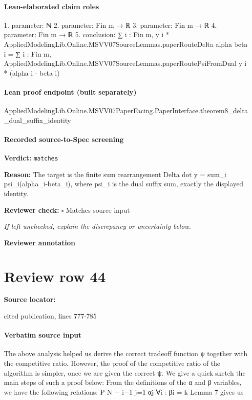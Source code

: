 \documentclass[10pt]{article}
\newcommand{\reviewerbox}{%
  \par\noindent\fbox{\parbox{0.96\linewidth}{\rule{0pt}{0.38in}}}\par
}
\newcommand{\reviewmatch}[1]{%
  \par\noindent\textbf{Reviewer check:} $\square$\; #1\par
  \noindent\emph{If left unchecked, explain the discrepancy or uncertainty below.}\par
}
\begin{document}
\paragraph{Lean-elaborated claim roles}\begin{ReviewVerbatim}
1. parameter: ℕ
2. parameter: Fin m → ℝ
3. parameter: Fin m → ℝ
4. parameter: Fin m → ℝ
5. conclusion: ∑ i : Fin m, y i * AppliedModelingLib.Online.MSVV07SourceLemmas.paperRouteDelta alpha beta i =
  ∑ i : Fin m, AppliedModelingLib.Online.MSVV07SourceLemmas.paperRoutePsiFromDual y i * (alpha i - beta i)
\end{ReviewVerbatim}

\paragraph{Lean proof endpoint (built separately)}\begin{ReviewVerbatim}
AppliedModelingLib.Online.MSVV07PaperFacing.PaperInterface.theorem8_delta_dual_suffix_identity
\end{ReviewVerbatim}

\paragraph{Recorded source-to-Spec screening}
\textbf{Verdict:} \texttt{matches}
\\
{\raggedright
\textbf{Reason:} The target is the finite sum rearrangement Delta dot y = sum\_\allowbreak{}i psi\_\allowbreak{}i(alpha\_\allowbreak{}i-\allowbreak{}beta\_\allowbreak{}i), where psi\_\allowbreak{}i is the dual suffix sum, exactly the displayed identity.\allowbreak{}
\par}
\reviewmatch{Matches source input}
\noindent\textbf{Reviewer annotation}\par
\reviewerbox
\clearpage
\hypertarget{source-claim-d6133428f4c419d0}{}
\section*{Review row 44}
\textbf{Source locator:} {\footnotesize\raggedright cited publication, lines 777-\allowbreak{}785\par}
\paragraph{Verbatim source input}
\begin{ReviewVerbatim}
The above analysis helped us derive the correct tradeoff function ψ together with the competitive ratio. However, the proof of the competitive ratio of the algorithm is simpler, once we
are given the correct ψ. We give a quick sketch the main steps of such a proof below:
From the definitions of the α and β variables, we have the following relations:
P
N − i−1
j=1 αj
∀i : βi =
k
Lemma 7 gives us
\end{ReviewVerbatim}
\end{document}
